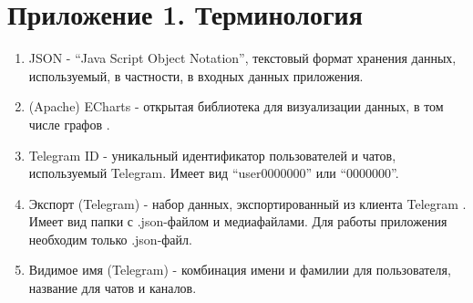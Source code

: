 \section{Приложение 1. Терминология}

\begin{enumerate}
    \item JSON - ``Java Script Object Notation'', текстовый формат хранения данных, используемый, в частности, в входных данных приложения.
    \item (Apache) ECharts - открытая библиотека для визуализации данных, в том числе графов \cite{echarts}. 
    \item Telegram ID - уникальный идентификатор пользователей и чатов, используемый Telegram. Имеет вид ``user0000000'' или ``0000000''.
    \item Экспорт (Telegram) - набор данных, экспортированный из клиента Telegram \cite{telegramExport}. Имеет вид папки с .json-файлом и медиафайлами. Для работы приложения необходим только .json-файл.
    \item Видимое имя (Telegram) - комбинация имени и фамилии для пользователя, название для чатов и каналов.
\end{enumerate}